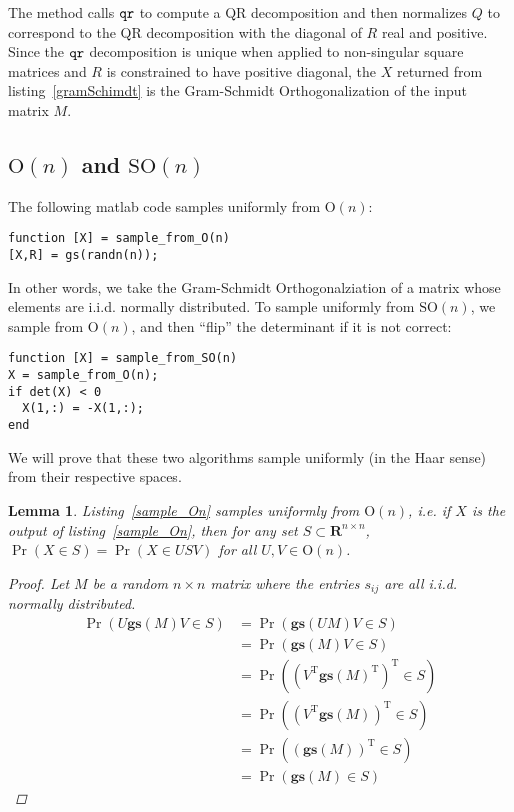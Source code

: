 \documentclass[letterpaper,11pt]{article}
\newtheorem{lemma}{Lemma}
\newcommand{\Tr}{^\text{T}}
\newcommand{\reals}{\mathbf{R}}
\newcommand{\MG}[2]{{\text{#1}(#2)}}
\newcommand{\On}{\MG{O}{n}}
\newcommand{\SOn}{\MG{SO}{n}}
\newcommand{\GS}{\mathbf{gs}}
\begin{document}
The method calls $\tt{qr}$ to compute a QR decomposition and then normalizes $Q$ to correspond to the
	 QR decomposition with the diagonal of $R$ real and positive. Since the $\tt{qr}$ decomposition is 
	 unique when applied to non-singular square matrices and $R$ is constrained to have positive 
	 diagonal, the $X$ returned from listing~\ref{gramSchimdt} is the Gram-Schmidt Orthogonalization
	 of the input matrix $M$. 



\subsection{$\On$ and $\SOn$}
The following matlab code samples uniformly from $\On$:

\begin{lstlisting}[label=sample_On,caption=Sampling from $\On$]
function [X] = sample_from_O(n)
[X,R] = gs(randn(n));
\end{lstlisting}

In other words, we take the Gram-Schmidt Orthogonalziation of a matrix whose elements are i.i.d.
  normally distributed.
To sample uniformly from $\SOn$, we sample from $\On$, and then
  ``flip'' the determinant if it is not correct:

\begin{lstlisting}[label=sample_SOn,caption=Sampling from $\SOn$]
function [X] = sample_from_SO(n)
X = sample_from_O(n);
if det(X) < 0
  X(1,:) = -X(1,:);
end
\end{lstlisting}

We will prove that these two algorithms sample uniformly (in the Haar sense)
  from their respective spaces.

\begin{lemma}
Listing~\ref{sample_On} samples uniformly from $\On$, i.e. if $X$
  is the output of listing~\ref{sample_On}, then for any set $S\subset
  \reals^{n\times n}$, $\Pr(X\in S) = \Pr(X\in USV)$ for all $U,V \in \On$.

\begin{proof}
Let $M$ be a random $n\times n$ matrix where the entries $s_{ij}$ are all i.i.d.
  normally distributed.
\begin{align}
\Pr\left(U\GS(M)V\in S\right) &= \Pr\left(\GS(UM)V \in S\right)\\
  &= \Pr\left(\GS(M)V \in S             \right)\\
  &= \Pr\left( (V\Tr\GS(M)\Tr)\Tr \in S \right)\\
  &= \Pr\left( (V\Tr\GS(M))\Tr \in S    \right)\\
  &= \Pr\left((\GS(M))\Tr \in S         \right)\\
  &= \Pr\left(\GS(M) \in S              \right)
\end{align}
\end{proof}
\end{lemma}
\end{document}
